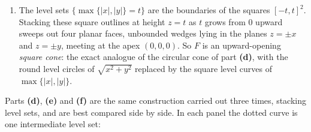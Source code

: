 \begin{exercisesolution}
\begin{enumerate}[label=\textbf{(\alph*)}]
  \item The level sets $\{\max\{|x|,|y|\}=t\}$ are the boundaries of the squares $[-t,t]^2$.
    Stacking these square outlines at height $z=t$ as $t$ grows from $0$ upward sweeps out four
    planar faces, unbounded wedges lying in the planes $z = \pm x$ and $z = \pm y$, meeting at the
    apex $(0,0,0)$. So $F$ is an upward-opening
    \emph{square cone}: the exact analogue of the circular cone of part \textbf{(d)}, with the
    round level circles of $\sqrt{x^2+y^2}$ replaced by the square level curves of
    $\max\{|x|,|y|\}$.
\end{enumerate}

Parts \textbf{(d)}, \textbf{(e)} and \textbf{(f)} are the same construction carried out three
times, stacking level sets, and are best compared side by side. In each panel the dotted curve is
one intermediate level set:

\begin{center}
\end{center}
\end{exercisesolution}
